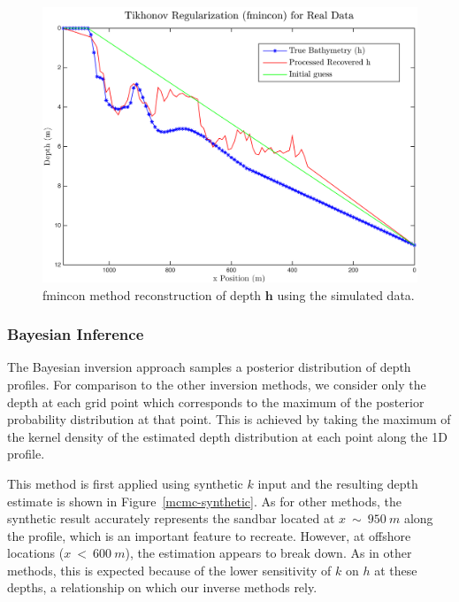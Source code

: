 \begin{figure}[H]
\center
\includegraphics[scale=0.46]{img/fmincon_real_data_oct09.png} %
\caption{fmincon method reconstruction of depth $\mathbf{h}$ using the simulated data.}
\label{fmincon_simulated}
\end{figure}




\subsubsection{Bayesian Inference}
The Bayesian inversion approach samples a posterior distribution of depth profiles. For comparison to the other inversion methods, we consider only the depth at each grid point which corresponds to the maximum of the posterior probability distribution at that point. This is achieved by taking the maximum of the kernel density of the estimated depth distribution at each point along the 1D profile. 

This method is first applied using synthetic $k$ input and the resulting depth estimate is shown in Figure~\ref{mcmc-synthetic}. As for other methods, the synthetic result accurately represents the sandbar located at $x~\sim~950~m$ along the profile, which is an important feature to recreate. However, at offshore locations ($x~<~600~m$), the estimation appears to break down. As in other methods, this is expected because of the lower sensitivity of $k$ on $h$ at these depths, a relationship on which our inverse methods rely.


